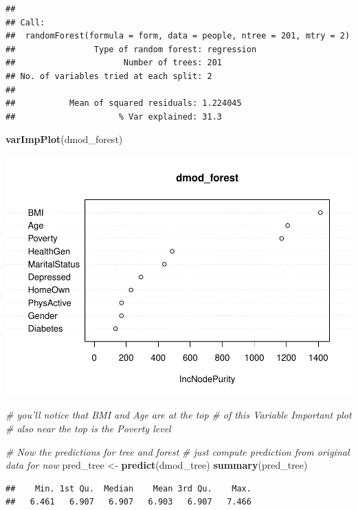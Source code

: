 \documentclass[]{article}
\newenvironment{Shaded}{\begin{snugshade}}{\end{snugshade}}
\newcommand{\KeywordTok}[1]{\textcolor[rgb]{0.13,0.29,0.53}{\textbf{{#1}}}}
\newcommand{\StringTok}[1]{\textcolor[rgb]{0.31,0.60,0.02}{{#1}}}
\newcommand{\CommentTok}[1]{\textcolor[rgb]{0.56,0.35,0.01}{\textit{{#1}}}}
\newcommand{\NormalTok}[1]{{#1}}
\begin{document}
\begin{verbatim}
## 
## Call:
##  randomForest(formula = form, data = people, ntree = 201, mtry = 2) 
##                Type of random forest: regression
##                      Number of trees: 201
## No. of variables tried at each split: 2
## 
##           Mean of squared residuals: 1.224045
##                     % Var explained: 31.3
\end{verbatim}

\begin{Shaded}
\begin{Highlighting}[]
\KeywordTok{varImpPlot}\NormalTok{(dmod_forest)}
\end{Highlighting}
\end{Shaded}

\includegraphics{Hmwk7AnswerKey_files/figure-latex/unnamed-chunk-28-2.pdf}

\begin{Shaded}
\begin{Highlighting}[]
\CommentTok{# you'll notice that BMI and Age are at the top}
\CommentTok{# of this Variable Important plot}
\CommentTok{# also near the top is the Poverty level}

\CommentTok{# Now the predictions for tree and forest}
\CommentTok{# just compute prediction from original data for now}
\NormalTok{pred_tree <-}\StringTok{ }\KeywordTok{predict}\NormalTok{(dmod_tree)}
\KeywordTok{summary}\NormalTok{(pred_tree)}
\end{Highlighting}
\end{Shaded}

\begin{verbatim}
##    Min. 1st Qu.  Median    Mean 3rd Qu.    Max. 
##   6.461   6.907   6.907   6.903   6.907   7.466
\end{verbatim}
\end{document}
